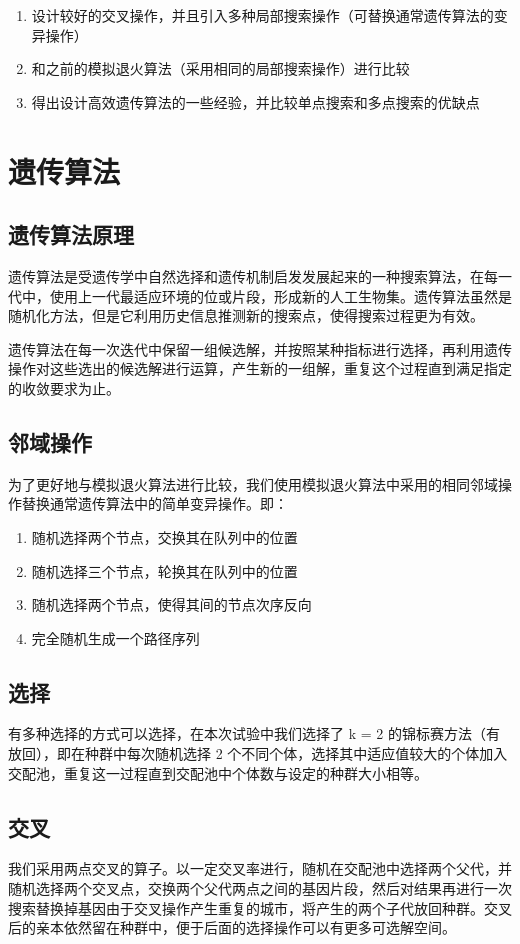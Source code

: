 \begin{enumerate}
    \item 设计较好的交叉操作，并且引入多种局部搜索操作（可替换通常遗传算法的变异操作）
    \item 和之前的模拟退火算法（采用相同的局部搜索操作）进行比较
    \item 得出设计高效遗传算法的一些经验，并比较单点搜索和多点搜索的优缺点
\end{enumerate}

\section{遗传算法}
\subsection{遗传算法原理}
遗传算法是受遗传学中自然选择和遗传机制启发发展起来的一种搜索算法，在每一代中，使用上一代最适应环境的位或片段，形成新的人工生物集。遗传算法虽然是随机化方法，但是它利用历史信息推测新的搜索点，使得搜索过程更为有效。

遗传算法在每一次迭代中保留一组候选解，并按照某种指标进行选择，再利用遗传操作对这些选出的候选解进行运算，产生新的一组解，重复这个过程直到满足指定的收敛要求为止。

\subsection{邻域操作}
为了更好地与模拟退火算法进行比较，我们使用模拟退火算法中采用的相同邻域操作替换通常遗传算法中的简单变异操作。即：

\begin{enumerate}
    \item 随机选择两个节点，交换其在队列中的位置
    \item 随机选择三个节点，轮换其在队列中的位置
    \item 随机选择两个节点，使得其间的节点次序反向
    \item 完全随机生成一个路径序列
\end{enumerate}

\subsection{选择}
有多种选择的方式可以选择，在本次试验中我们选择了 k = 2 的锦标赛方法（有放回），即在种群中每次随机选择 2 个不同个体，选择其中适应值较大的个体加入交配池，重复这一过程直到交配池中个体数与设定的种群大小相等。

\subsection{交叉}
我们采用两点交叉的算子。以一定交叉率进行，随机在交配池中选择两个父代，并随机选择两个交叉点，交换两个父代两点之间的基因片段，然后对结果再进行一次搜索替换掉基因由于交叉操作产生重复的城市，将产生的两个子代放回种群。交叉后的亲本依然留在种群中，便于后面的选择操作可以有更多可选解空间。

